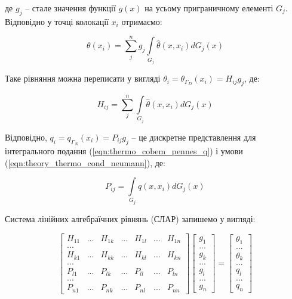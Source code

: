 \noindent де $g_j$ -- стале значення функції $g(x)$ на усьому пригранич­ному елементі $G_j$. Відповідно у точці
колокації $x_i$ отримаємо:

\begin{equation*}
  \theta(x_i) = \sum_j^n g_j \int \limits_{G_j} \hat{\theta}(x,x_i)dG_j(x)
\end{equation*}

\noindent Таке рівняння можна переписати у вигляді $\theta_i = \theta_{\Gamma_D}(x_i) = H_{ij} g_j$, де: 

\begin{equation*}
  H_{ij} = \sum_j^n \int \limits_{G_j} \hat{\theta}(x,x_i)dG_j(x)
\end{equation*}

\noindent Відповідно, $q_i = q_{\Gamma_N}(x_i) = P_{ij} g_j$ -- це дискретне представлення для інтегрального подання
(\ref{eqn:thermo_cobem_pennes_q}) і умови (\ref{eqn:theory_thermo_cond_neumann}), де:

\begin{equation*}
  P_{ij} = \int \limits_{G_j} \hat{q}(x,x_i)dG_j(x)
\end{equation*}

Система лінійних алгебраїчних рівнянь (СЛАР) запишемо у вигляді:

\begin{equation*}
  \begin{bmatrix}
    H_{11} & ... & H_{1k} & ... & H_{1l} & ...  & H_{1n} \\
    ... \\
    H_{k1} & ... & H_{kk} & ... & H_{kl} & ...  & H_{kn} \\
    ... \\
    P_{l1} & ... & P_{lk} & ... & P_{ll} & ...  & P_{ln} \\
    ... \\
    P_{n1} & ... & P_{nk} & ... & P_{nl} & ...  & P_{nn}
  \end{bmatrix}
  \begin{bmatrix}
    g_1 \\
    ...   \\
    g_k \\
    ... \\
    g_l \\
    ... \\
    g_n
  \end{bmatrix}
  =
  \begin{bmatrix}
    \theta_1 \\
    ...   \\
    \theta_k \\
    ... \\
    q_l \\
    ... \\
    q_n
  \end{bmatrix}
\end{equation*}

